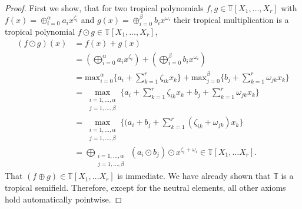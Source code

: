 \documentclass{article}
\theoremstyle{definition}
\begin{document}
\begin{proof}
First we show, that for two tropical polynomials $f, g \in \mathbb{T}[X_1, \dots , X_r]$ with $f(x) =\oplus_{i=0}^{\alpha} a_{i} x^{\zeta_{i}}$ and $g(x)= \oplus_{i=0}^{\beta} b_{i} x^{\omega_{i}}$ their tropical multiplication is a tropical polynomial $f \odot g \in \mathbb{T}[X_1, \dots , X_r]$,
\begin{align*} 
(f \odot g)(x) &= f(x) + g(x) \\
&=  (\bigoplus_{i=0}^{\alpha} a_{i} x^{\zeta_{i}}) + (\bigoplus_{i=0}^{\beta} b_{i} x^{\omega_{i}}) \\
&= \text{max}_{i=0}^{\alpha} \{ a_{i} + \sum_{k=1}^{r} \zeta_{ik} x_{k} \} + \text{max}_{j=0}^{\beta} \{ b_{j} + \sum_{k=1}^{r} \omega_{jk} x_{k} \} \\
&= \max_{\substack{
   i=1, \dots , \alpha \\
   j=1, \dots , \beta
  }} \{ a_{i} + \sum_{k=1}^{r} \zeta_{ik} x_{k} + b_{j} + \sum_{k=1}^{r} \omega_{jk} x_{k} \} \\
&= \max_{\substack{
   i=1, \dots , \alpha \\
   j=1, \dots , \beta
  }} \{ (a_{i} + b_{j} + \sum_{k=1}^{r} (\zeta_{ik} + \omega_{jk}) x_{k} \} \\
&= \bigoplus_{\substack{
   i=1, \dots , \alpha \\
   j=1, \dots , \beta
  }} \ (a_{i} \odot b_{j}) \odot x^{\zeta_{i} + \omega_{i}} \in \mathbb{T}[X_1, \dots X_r].
\end{align*}
That $(f \oplus g) \in \mathbb{T}[X_1, \dots X_r]$ is immediate. We have already shown that $\mathbb{T}$ is a tropical semifield. Therefore, except for the neutral elements, all other axioms hold automatically pointwise.


\end{proof}
\end{document}
